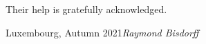
\vspace{0.3cm}
Their help is gratefully acknowledged.

\vspace{\baselineskip}
\begin{flushright}\noindent
Luxembourg, Autumn 2021\hfill {\it Raymond Bisdorff}\\
\end{flushright}


